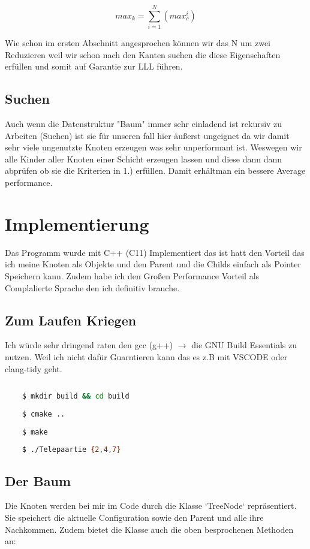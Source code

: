 \documentclass{article}
\begin{document}
\begin{equation}
	max_k =  \sum \limits_{i=1}^N  (max_c ^ i)
\end{equation}

Wie schon im ersten Abschnitt angesprochen können wir das N um zwei Reduzieren weil wir schon nach den Kanten suchen die diese Eigenschaften erfüllen und somit auf Garantie zur LLL führen.

\subsection*{ Suchen }

Auch wenn die Datenstruktur "Baum" immer sehr einladend ist rekursiv zu Arbeiten (Suchen) ist sie für unseren fall hier äußerst ungeignet da wir damit sehr viele ungenutzte Knoten erzeugen was sehr unperformant ist. Weswegen wir alle Kinder aller Knoten einer Schicht erzeugen lassen und diese dann dann abprüfen ob sie die Kriterien in 1.) erfüllen. Damit erhältman ein bessere Average performance.


\section{ Implementierung }

Das Programm wurde mit C++ (C11) Implementiert das ist hatt den Vorteil das ich meine Knoten als Objekte und den Parent und die Childs einfach als Pointer Speichern kann. Zudem habe ich den Großen Performance Vorteil als Complalierte Sprache den ich definitiv brauche.

\subsection*{ Zum Laufen Kriegen }

Ich würde sehr dringend raten den gcc (g++) \(\rightarrow\) die GNU Build Essentials zu nutzen. Weil ich nicht dafür Guarntieren kann das es z.B mit VSCODE oder clang-tidy geht.

\begin{lstlisting}[language=Bash]
	
	$ mkdir build && cd build
	
	$ cmake ..
	
	$ make
	
	$ ./Telepaartie {2,4,7}

\end{lstlisting}

\subsection*{ Der Baum }

Die Knoten werden bei mir im Code durch die Klasse `TreeNode` repräsentiert. Sie speichert die aktuelle Configuration sowie den Parent und alle ihre Nachkommen. Zudem bietet die Klasse auch die oben besprochenen Methoden an: 
\end{document}
